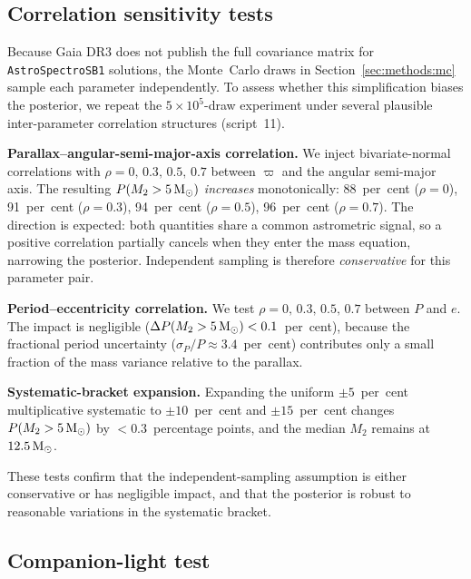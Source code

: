 \documentclass[usenatbib,fleqn]{mnras}
\newcommand{\Msun}{{\rm M}_\odot}
\begin{document}
\subsection{Correlation sensitivity tests}
\label{sec:methods:correlation}

Because Gaia DR3 does not publish the full covariance matrix for
\texttt{AstroSpectroSB1} solutions, the Monte~Carlo draws in
Section~\ref{sec:methods:mc} sample each parameter independently.
To assess whether this simplification biases the posterior, we
repeat the $5\times10^5$-draw experiment under several plausible
inter-parameter correlation structures (script~11).

\textbf{Parallax--angular-semi-major-axis correlation.}  We
inject bivariate-normal correlations with
$\rho = 0,\,0.3,\,0.5,\,0.7$ between $\varpi$ and the angular
semi-major axis.  The resulting $P(M_2 > 5\,\Msun)$
\emph{increases} monotonically:
88~per~cent ($\rho = 0$), 91~per~cent ($\rho = 0.3$),
94~per~cent ($\rho = 0.5$), 96~per~cent ($\rho = 0.7$).
The direction is expected: both quantities share a common
astrometric signal, so a positive correlation partially cancels
when they enter the mass equation, narrowing the posterior.
Independent sampling is therefore \emph{conservative} for this
parameter pair.

\textbf{Period--eccentricity correlation.}  We test
$\rho = 0,\,0.3,\,0.5,\,0.7$ between $P$ and $e$.  The impact is
negligible ($\Delta P(M_2 > 5\,\Msun) < 0.1$~per~cent), because
the fractional period uncertainty ($\sigma_P/P \approx 3.4$~per~cent)
contributes only a small fraction of the mass variance relative to
the parallax.

\textbf{Systematic-bracket expansion.}  Expanding the uniform
$\pm 5$~per~cent multiplicative systematic to $\pm 10$~per~cent and
$\pm 15$~per~cent changes $P(M_2 > 5\,\Msun)$ by $< 0.3$~percentage
points, and the median $M_2$ remains at $12.5\,\Msun$.

These tests confirm that the independent-sampling assumption is
either conservative or has negligible impact, and that the
posterior is robust to reasonable variations in the systematic
bracket.

\subsection{Companion-light test}
\label{sec:methods:companion}
\end{document}
